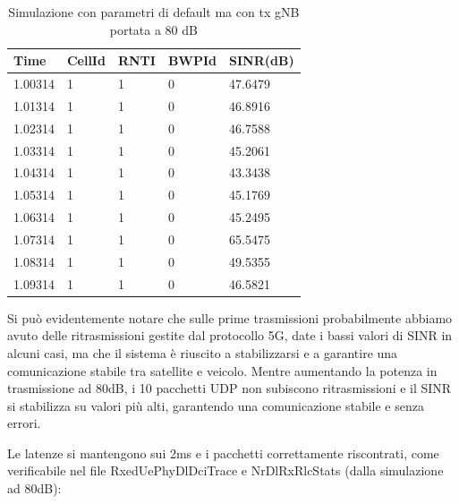 \documentclass[12pt,a4paper]{article}
\begin{document}
\begin{table}[!ht]
    \centering
    \begin{tabular}{|l|l|l|l|l|}
    \hline
        Time & CellId & RNTI & BWPId & SINR(dB) \\ \hline
        1.00314 & 1 & 1 & 0 & 47.6479 \\ \hline
        1.01314 & 1 & 1 & 0 & 46.8916 \\ \hline
        1.02314 & 1 & 1 & 0 & 46.7588 \\ \hline
        1.03314 & 1 & 1 & 0 & 45.2061 \\ \hline
        1.04314 & 1 & 1 & 0 & 43.3438 \\ \hline
        1.05314 & 1 & 1 & 0 & 45.1769 \\ \hline
        1.06314 & 1 & 1 & 0 & 45.2495 \\ \hline
        1.07314 & 1 & 1 & 0 & 65.5475 \\ \hline
        1.08314 & 1 & 1 & 0 & 49.5355 \\ \hline
        1.09314 & 1 & 1 & 0 & 46.5821 \\ \hline
    \end{tabular}
    \caption{Simulazione con parametri di default ma con tx gNB portata a 80 dB}
\end{table}

Si può evidentemente notare che sulle prime trasmissioni probabilmente abbiamo avuto delle ritrasmissioni gestite dal protocollo 5G, date i bassi valori di SINR in alcuni casi, ma che il sistema è riuscito a stabilizzarsi e a garantire una comunicazione stabile tra satellite e veicolo.
Mentre aumentando la potenza in trasmissione ad 80dB, i 10 pacchetti UDP non subiscono ritrasmissioni e il SINR si stabilizza su valori più alti, garantendo una comunicazione stabile e senza errori.

Le latenze si mantengono sui 2ms e i pacchetti correttamente riscontrati, come verificabile nel file RxedUePhyDlDciTrace e NrDlRxRlcStats (dalla simulazione ad 80dB):
\end{document}
